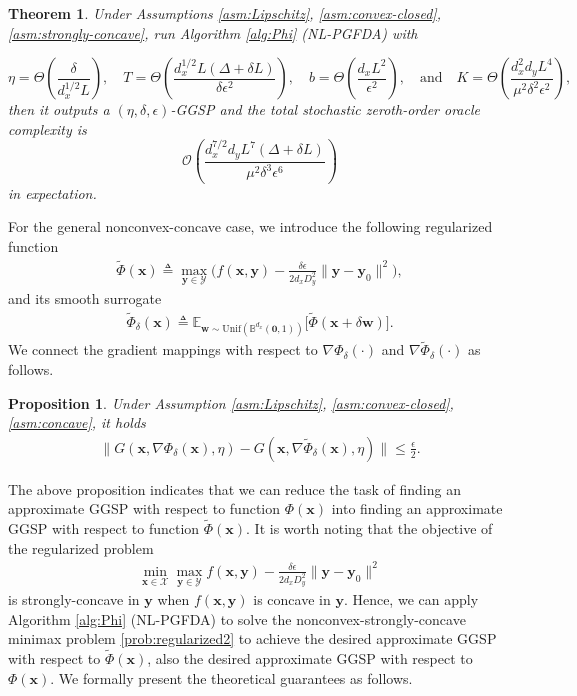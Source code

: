 \documentclass[11pt]{article}
\def\vzero{\mathbf{0}}
\def\vw{\mathbf{w}}
\def\vx{\mathbf{x}}
\def\vy{\mathbf{y}}
\def\fO{{\mathcal{O}}}
\def\fX{{\mathcal{X}}}
\def\fY{{\mathcal{Y}}}
\newtheorem{theorem}{Theorem}
\newtheorem{proposition}{Proposition}
\begin{document}
\begin{theorem}\label{Theorem of Phi}
Under Assumptions  \ref{asm:Lipschitz}, \ref{asm:convex-closed}, \ref{asm:strongly-concave}, run Algorithm \ref{alg:Phi} (NL-PGFDA) with

\[
\eta=\Theta\left(\frac{\delta}{d_x^{1/2}L}\right),\quad \!\! T=\Theta\left(\frac{d_x^{1/2}L(\Delta+\delta L)}{\delta\epsilon^2}\right),\quad\!\!
b=\Theta\left(\frac{d_xL^2}{\epsilon^2}\right),
\quad\!\!
\text{and}\quad\!\!
K=\Theta\left(\frac{d_x^2d_yL^4}{\mu^2\delta^2\epsilon^2}\right),
\]
then it outputs a $(\eta,\delta,\epsilon)$-GGSP 
and the total stochastic zeroth-order oracle complexity is 
\[
\fO\left(\frac{ d_x^{7/2} d_y L^7 (\Delta+\delta L)}{\mu^2\delta^3 \epsilon^6}\right)
\]
in expectation.
\end{theorem}



For the general nonconvex-concave case, 
we introduce the following regularized function
\begin{align}\label{eq:tilde-Phi}
    \tilde\Phi(\vx)\triangleq\max_{\vy\in\fY} \Big(f(\vx,\vy)-\frac{\delta\epsilon}{2 d_x D_y^2}\|\vy-\vy_0\|^2\Big),
\end{align}
and its smooth surrogate 
\begin{align}\label{Phi_mu,Phi_delta,mu}
\tilde\Phi_{\delta}(\vx) \triangleq \mathbb{E}_{\vw\sim \mathrm{Unif}(\mathbb{B}^{d_x}(\vzero,1))}\big[\tilde\Phi(\vx + \delta \vw)\big].   
\end{align}
We connect the gradient mappings with respect to $\nabla\Phi_\delta(\cdot)$ and $\nabla\tilde\Phi_{\delta}(\cdot)$ as follows.

\begin{proposition}\label{gradient distance of the strongly concave approximation}
  Under Assumption \ref{asm:Lipschitz}, \ref{asm:convex-closed}, \ref{asm:concave},  it holds
\begin{align*}
\big\|G(\vx,\nabla\Phi_\delta(\vx),\eta) - G(\vx,\nabla\tilde\Phi_{\delta}(\vx),\eta)\big\|
\le \frac{\epsilon}{2}.
\end{align*}
\end{proposition}
The above proposition indicates that we can reduce the task of
finding an approximate GGSP with respect to function $\Phi(\vx)$
into finding an approximate GGSP with respect to function $\tilde\Phi(\vx)$.
It is worth noting that the objective of the regularized problem
\begin{align}\label{prob:regularized2}
\min_{\vx\in\fX}\max_{\vy\in\fY} f(\vx,\vy)-\frac{\delta\epsilon}{2 d_x D_y^2}\|\vy-\vy_0\|^2    
\end{align}
is strongly-concave in $\vy$ when $f(\vx,\vy)$ is concave in $\vy$.
Hence,  we can apply Algorithm \ref{alg:Phi} (NL-PGFDA)
to solve the nonconvex-strongly-concave minimax problem \eqref{prob:regularized2}
to achieve the desired approximate GGSP with respect to $\tilde\Phi(\vx)$, 
also the desired approximate GGSP with respect to $\Phi(\vx)$.
We formally present the theoretical guarantees as follows. 
\end{document}
